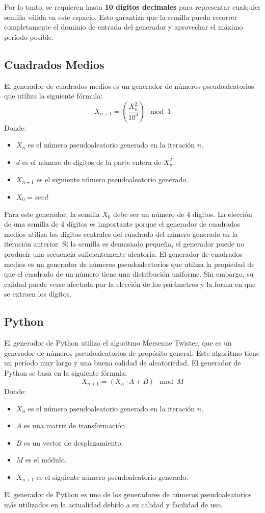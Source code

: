 \documentclass{article}
\begin{document}
Por lo tanto, se requieren hasta \textbf{10 dígitos decimales} para representar cualquier semilla válida en este espacio. Esto garantiza que la semilla pueda recorrer completamente el dominio de entrada del generador y aprovechar el máximo período posible.

\subsection{Cuadrados Medios}
El generador de cuadrados medios es un generador de números pseudoaleatorios que utiliza la siguiente fórmula:
\begin{equation}
    X_{n+1} = \left( \frac{X_n^2}{10^{d}} \right) \mod 1
\end{equation}
Donde:
\begin{itemize}
    \item $X_n$ es el número pseudoaleatorio generado en la iteración $n$.
    \item $d$ es el número de dígitos de la parte entera de $X_n^2$.
    \item $X_{n+1}$ es el siguiente número pseudoaleatorio generado.
    \item $X_0 = seed$
\end{itemize}
Para este generador, la semilla $X_0$ debe ser un número de 4 dígitos. La elección de una semilla de 4 dígitos es importante porque el generador de cuadrados medios utiliza los dígitos centrales del cuadrado del número generado en la iteración anterior. Si la semilla es demasiado pequeña, el generador puede no producir una secuencia suficientemente aleatoria.
El generador de cuadrados medios es un generador de números pseudoaleatorios que utiliza la propiedad de que el cuadrado de un número tiene una distribución uniforme. Sin embargo, su calidad puede verse afectada por la elección de los parámetros y la forma en que se extraen los dígitos.
\subsection{Python}
El generador de Python utiliza el algoritmo Mersenne Twister, que es un generador de números pseudoaleatorios de propósito general. Este algoritmo tiene un período muy largo y una buena calidad de aleatoriedad. El generador de Python se basa en la siguiente fórmula:
\begin{equation}
    X_{n+1} = (X_n \cdot A + B) \mod M
\end{equation}
Donde:
\begin{itemize}
    \item $X_n$ es el número pseudoaleatorio generado en la iteración $n$.
    \item $A$ es una matriz de transformación.
    \item $B$ es un vector de desplazamiento.
    \item $M$ es el módulo.
    \item $X_{n+1}$ es el siguiente número pseudoaleatorio generado.
\end{itemize}
El generador de Python es uno de los generadores de números pseudoaleatorios más utilizados en la actualidad debido a su calidad y facilidad de uso.
\end{document}
